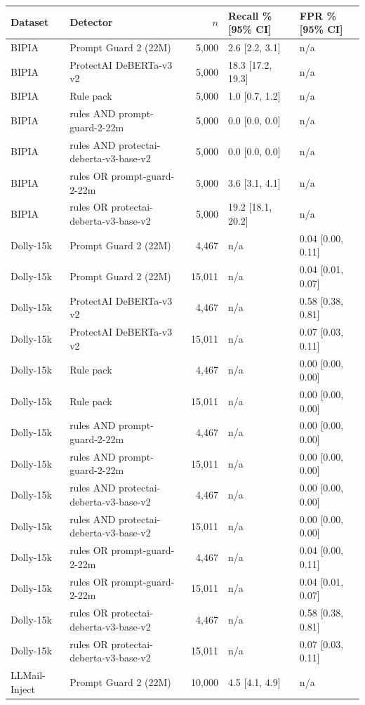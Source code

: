 \begin{tabular}{llrll}
\toprule
Dataset & Detector & $n$ & Recall \% [95\% CI] & FPR \% [95\% CI] \\
\midrule
BIPIA & Prompt Guard 2 (22M) & 5,000 & 2.6 [2.2, 3.1] & n/a \\
BIPIA & ProtectAI DeBERTa-v3 v2 & 5,000 & 18.3 [17.2, 19.3] & n/a \\
BIPIA & Rule pack & 5,000 & 1.0 [0.7, 1.2] & n/a \\
BIPIA & rules AND prompt-guard-2-22m & 5,000 & 0.0 [0.0, 0.0] & n/a \\
BIPIA & rules AND protectai-deberta-v3-base-v2 & 5,000 & 0.0 [0.0, 0.0] & n/a \\
BIPIA & rules OR prompt-guard-2-22m & 5,000 & 3.6 [3.1, 4.1] & n/a \\
BIPIA & rules OR protectai-deberta-v3-base-v2 & 5,000 & 19.2 [18.1, 20.2] & n/a \\
Dolly-15k & Prompt Guard 2 (22M) & 4,467 & n/a & 0.04 [0.00, 0.11] \\
Dolly-15k & Prompt Guard 2 (22M) & 15,011 & n/a & 0.04 [0.01, 0.07] \\
Dolly-15k & ProtectAI DeBERTa-v3 v2 & 4,467 & n/a & 0.58 [0.38, 0.81] \\
Dolly-15k & ProtectAI DeBERTa-v3 v2 & 15,011 & n/a & 0.07 [0.03, 0.11] \\
Dolly-15k & Rule pack & 4,467 & n/a & 0.00 [0.00, 0.00] \\
Dolly-15k & Rule pack & 15,011 & n/a & 0.00 [0.00, 0.00] \\
Dolly-15k & rules AND prompt-guard-2-22m & 4,467 & n/a & 0.00 [0.00, 0.00] \\
Dolly-15k & rules AND prompt-guard-2-22m & 15,011 & n/a & 0.00 [0.00, 0.00] \\
Dolly-15k & rules AND protectai-deberta-v3-base-v2 & 4,467 & n/a & 0.00 [0.00, 0.00] \\
Dolly-15k & rules AND protectai-deberta-v3-base-v2 & 15,011 & n/a & 0.00 [0.00, 0.00] \\
Dolly-15k & rules OR prompt-guard-2-22m & 4,467 & n/a & 0.04 [0.00, 0.11] \\
Dolly-15k & rules OR prompt-guard-2-22m & 15,011 & n/a & 0.04 [0.01, 0.07] \\
Dolly-15k & rules OR protectai-deberta-v3-base-v2 & 4,467 & n/a & 0.58 [0.38, 0.81] \\
Dolly-15k & rules OR protectai-deberta-v3-base-v2 & 15,011 & n/a & 0.07 [0.03, 0.11] \\
LLMail-Inject & Prompt Guard 2 (22M) & 10,000 & 4.5 [4.1, 4.9] & n/a \\

\end{tabular}
